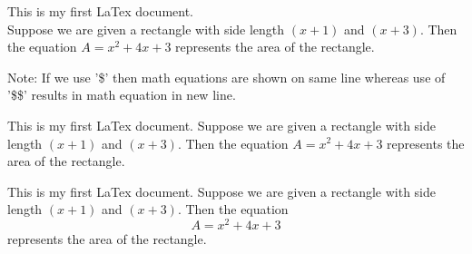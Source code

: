 \documentclass[10]{article}
\begin{document}
This is my first LaTex document. \\ 
Suppose we are given a rectangle with side length $(x+1) $ and $(x+3)$. Then the equation $A = x^2+4x+3 $ represents the area of the rectangle.

Note: If we use '\$' then math equations are shown on same line whereas use of '\$\$' results in math equation in new line.

This is my first LaTex document. 
Suppose we are given a rectangle with side length $(x+1) $ and $(x+3)$. Then the equation $A = x^2+4x+3 $ represents the area of the rectangle.

This is my first LaTex document. 
Suppose we are given a rectangle with side length $(x+1) $ and $(x+3)$. Then the equation $$A = x^2+4x+3 $$ represents the area of the rectangle.
\end{document}
